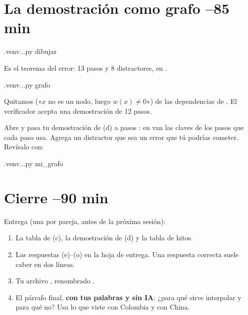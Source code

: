 \section{La demostración como grafo \hfill\small{}–85 min}
\begin{orden}
.venv\Scripts\python ..\docs\curso{}\experimentos.py dibujar
\end{orden}
Es el teorema del error: 13 pasos y 8 distractores, en .
\begin{preguntas}
\end{preguntas}
\begin{orden}
.venv\Scripts\python ..\docs\curso{}\experimentos.py grafo
\end{orden}
Quitamos  («$x$ no es un nodo, luego $w(x)\neq 0$») de las dependencias de . El verificador acepta una demostración de 12 pasos.
\begin{preguntas}
\end{preguntas}

\begin{nota}
Abre  y pasa tu demostración de (d) a pasos : en  van las claves de los pasos que cada paso usa. Agrega un distractor que sea un error que tú podrías cometer. Revísalo con:
\begin{orden}
.venv\Scripts\python ..\docs\curso{}\experimentos.py mi_grafo
\end{orden}
\end{nota}
\begin{preguntas}
\end{preguntas}

\section{Cierre \hfill\small{}–90 min}
Entrega (una por pareja, antes de la próxima sesión):
\begin{enumerate}
\item La tabla de (c), la demostración de (d) y la tabla de hitos.
\item Las respuestas (e)–(o) en la hoja de entrega. Una respuesta correcta suele caber en dos líneas.
\item Tu archivo , renombrado .
\item El párrafo final, \textbf{con tus palabras y sin IA}: ¿para qué sirve interpolar y para qué no? Usa lo que viste con Colombia y con China.
\end{enumerate}

